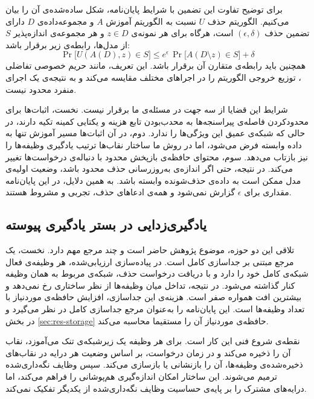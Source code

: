 برای توضیح تفاوت این تضمین با شرایط پایان‌نامه، شکل ساده‌شده‌ی آن را بیان می‌کنیم. الگوریتم حذف $U$ نسبت به الگوریتم آموزش $A$ و مجموعه‌داده‌ی $D$ دارای تضمین حذف $(\epsilon,\delta)$ است، هرگاه برای هر نمونه‌ی $z \in D$ و هر مجموعه‌ی اندازه‌پذیر $S$ از مدل‌ها، رابطه‌ی زیر برقرار باشد:
\begin{equation}
\label{eq:certified-unlearning-guarantee}
\Pr\big[U(A(D), z) \in S\big] \le e^{\epsilon}\,\Pr\big[A(D \setminus z) \in S\big] + \delta
\end{equation}
همچنین باید رابطه‌ی متقارن آن برقرار باشد. این تعریف، مانند حریم خصوصی تفاضلی \cite{dwork2014algorithmic}، توزیع خروجی الگوریتم را در اجراهای مختلف مقایسه می‌کند و به نتیجه‌ی یک اجرای منفرد محدود نیست.

شرایط این قضایا از سه جهت در مسئله‌ی ما برقرار نیست. نخست، اثبات‌ها برای محدودکردن فاصله‌ی پیراسنجه‌ها به محدب‌بودن تابع هزینه و یکتایی کمینه تکیه دارند، در حالی که شبکه‌ی عمیق این ویژگی‌ها را ندارد. دوم، در آن اثبات‌ها مسیر آموزش تنها به داده وابسته فرض می‌شود، اما در روش ما ساختار نقاب‌ها ترتیب یادگیری وظیفه‌ها را نیز بازتاب می‌دهد. سوم، محتوای حافظه‌ی بازپخش محدود با دنباله‌ی درخواست‌ها تغییر می‌کند. در نتیجه، حتی اگر اندازه‌ی به‌روزرسانی حذف محدود باشد، وضعیت اولیه‌ی مدل ممکن است به داده‌ی حذف‌شونده وابسته باشد. به همین دلایل، در این پایان‌نامه مقداری برای $\epsilon$ گزارش نمی‌شود و همه‌ی ادعاهای حذف، تجربی و مشروط هستند.

\subsection{یادگیری‌زدایی در بستر یادگیری پیوسته}
\label{subsec:lit-cl-unlearning}

تلاقی این دو حوزه، موضوع پژوهش حاضر است و چند مرجع مهم دارد. نخست،  \cite{liu2022clpu} یک مرجع مبتنی بر جداسازی کامل است. در پیاده‌سازی ارزیابی‌شده، هر وظیفه‌ی فعال شبکه‌ی کامل خود را دارد و با دریافت درخواست حذف، شبکه‌ی مربوط به همان وظیفه کنار گذاشته می‌شود. در نتیجه، تداخل میان وظیفه‌ها از نظر ساختاری رخ نمی‌دهد و بیشترین افت همواره صفر است. هزینه‌ی این جداسازی، افزایش حافظه‌ی موردنیاز با تعداد وظیفه‌ها است. این پایان‌نامه  را به‌عنوان مرجع جداسازی کامل در نظر می‌گیرد و در بخش \ref{sec:res-storage} حافظه‌ی موردنیاز آن را مستقیما محاسبه می‌کند.

 \cite{ozdenizci2025pall} نقطه‌ی شروع فنی این کار است.  برای هر وظیفه یک زیرشبکه‌ی تنک می‌آموزد، نقاب آن را ذخیره می‌کند و در زمان درخواست، بر اساس وضعیت هر درایه در نقاب‌های ذخیره‌شده‌ی وظیفه‌ها، آن را بازنشانی یا بازسازی می‌کند. سپس وظایف نگه‌داری‌شده ترمیم می‌شوند. این ساختار امکان اندازه‌گیری هم‌پوشانی را فراهم می‌کند، اما درایه‌های مشترک را بر پایه‌ی حساسیت وظایف نگه‌داری‌شده از یکدیگر تفکیک نمی‌کند.

